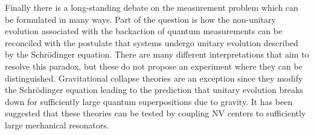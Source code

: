 Finally there is a long-standing debate on the measurement problem which can be formulated in many ways. Part of the question is how the non-unitary evolution associated with the backaction of quantum measurements can be reconciled with the postulate that systems undergo unitary evolution described by the Schr\"{o}dinger equation. There are many different interpretations that aim to resolve this paradox, but these do not propose an experiment where they can be distinguished. Gravitational collapse theories are an exception since they modify the Schr\"{o}dinger equation leading to the prediction that unitary evolution breaks down for sufficiently large quantum superpositions due to gravity\cite{Diosi_PhysicsLettersA_1987,Penrose_Phil.Trans.R.Soc.Lond.A_1998}. It has been suggested that these theories can be tested by coupling NV centers to sufficiently large mechanical resonators.\cite{Wezel_Proc.R.Soc.A_2012}
\clearpage



